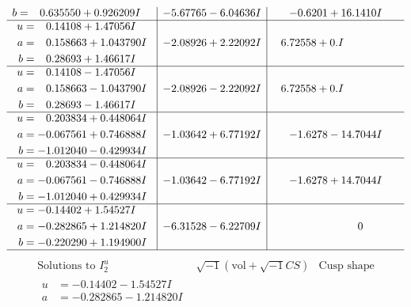 \documentclass[1p]{elsarticle_modified}
\theoremstyle{definition}
\newcommand{\I}{\sqrt{-1}}
\begin{document}
$$\begin{array}{c|c|c}
\begin{aligned}
b &= \phantom{-}0.635550 + 0.926209 I\end{aligned}
 & -5.67765 - 6.04636 I & -0.6201 + 16.1410 I \\ \hline\begin{aligned}
u &= \phantom{-}0.14108 + 1.47056 I \\
a &= \phantom{-}0.158663 + 1.043790 I \\
b &= \phantom{-}0.28693 + 1.46617 I\end{aligned}
 & -2.08926 + 2.22092 I & \phantom{-}6.72558 + 0. I\phantom{ +0.000000I} \\ \hline\begin{aligned}
u &= \phantom{-}0.14108 - 1.47056 I \\
a &= \phantom{-}0.158663 - 1.043790 I \\
b &= \phantom{-}0.28693 - 1.46617 I\end{aligned}
 & -2.08926 - 2.22092 I & \phantom{-}6.72558 + 0. I\phantom{ +0.000000I} \\ \hline\begin{aligned}
u &= \phantom{-}0.203834 + 0.448064 I \\
a &= -0.067561 + 0.746888 I \\
b &= -1.012040 - 0.429934 I\end{aligned}
 & -1.03642 + 6.77192 I & -1.6278 - 14.7044 I \\ \hline\begin{aligned}
u &= \phantom{-}0.203834 - 0.448064 I \\
a &= -0.067561 - 0.746888 I \\
b &= -1.012040 + 0.429934 I\end{aligned}
 & -1.03642 - 6.77192 I & -1.6278 + 14.7044 I \\ \hline\begin{aligned}
u &= -0.14402 + 1.54527 I \\
a &= -0.282865 + 1.214820 I \\
b &= -0.220290 + 1.194900 I\end{aligned}
 & -6.31528 - 6.22709 I & \phantom{-0.000000 } 0\\
 \hline 
 \end{array}$$\newpage$$\begin{array}{c|c|c}  
\text{Solutions to }I^u_{2}& \I (\text{vol} + \sqrt{-1}CS) & \text{Cusp shape}\\
 \hline 
\begin{aligned}
u &= -0.14402 - 1.54527 I \\
a &= -0.282865 - 1.214820 I \\

\end{aligned}
\end{array}$$
\end{document}

